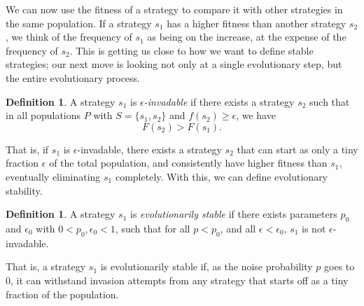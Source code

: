 \documentclass[12pt]{article}
\theoremstyle{definition}
\newtheorem{definition}[theorem]{Definition}
\theoremstyle{remark}
\begin{document}
We can now use the fitness of a strategy to compare it with other strategies in the same population. If a strategy $s_1$ has a higher fitness than another strategy $s_2$, we think of the frequency of $s_1$ as being on the increase, at the expense of the frequency of $s_2$. This is getting us close to how we want to define stable strategies; our next move is looking not only at a single evolutionary step, but the entire evolutionary process.

\begin{definition}
  A strategy $s_1$ is \textit{$\epsilon$-invadable} if there exists a strategy $s_2$ such that in all populations $P$ with $S = \{s_1,s_2\}$ and $f(s_2) \geq \epsilon$, we have 
  \begin{equation*}
    \label{fitnesscond}
    F(s_2) > F(s_1).
  \end{equation*}
\end{definition}

That is, if $s_1$ is $\epsilon$-invadable, there exists a strategy $s_2$ that can start as only a tiny fraction $\epsilon$ of the total population, and consistently have higher fitness than $s_1$, eventually eliminating $s_1$ completely. With this, we can define evolutionary stability.

\begin{definition}
  \label{definitionevolutionarystability}
  A strategy $s_1$ is \textit{evolutionarily stable} if there exists parameters $p_0$ and $\epsilon_0$ with $0 < p_0, \epsilon_0 < 1$, such that for all $p < p_0$, and all $\epsilon < \epsilon_0$, $s_1$ is not $\epsilon$-invadable.
\end{definition}

That is, a strategy $s_1$ is evolutionarily stable if, as the noise probability $p$ goes to 0, it can withstand invasion attempts from any strategy that starts off as a tiny fraction of the population.



\end{document}
